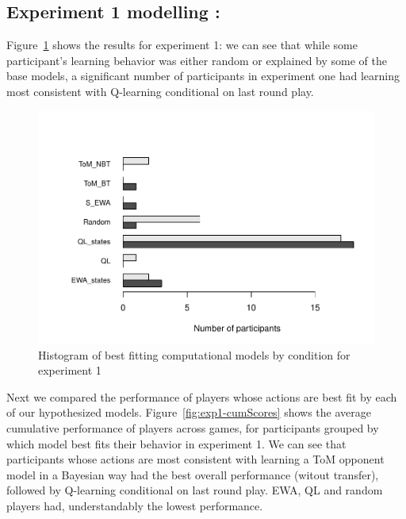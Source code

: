 \documentclass[man,floatsintext]{apa6}
\begin{document}
\hypertarget{experiment-1-modelling}{%
\subsection{Experiment 1 modelling :}\label{experiment-1-modelling}}

Figure~\ref{fig:exp1-comp-models} shows the results for experiment 1: we can see that while some participant's learning behavior was either random or explained by some of the base models, a significant number of participants in experiment one had learning most consistent with Q-learning conditional on last round play.

\begin{figure}

{\centering \includegraphics{draft_report_v1_files/figure-latex/exp1-comp-models-1} 

}

\caption{Histogram of best fitting computational models by condition for experiment 1}\label{fig:exp1-comp-models}
\end{figure}

Next we compared the performance of players whose actions are best fit by each of our hypothesized models. Figure~\ref{fig:exp1-cumScores} shows the average cumulative performance of players across games, for participants grouped by which model best fits their behavior in experiment 1. We can see that participants whose actions are most consistent with learning a ToM opponent model in a Bayesian way had the best overall performance (witout transfer), followed by Q-learning conditional on last round play. EWA, QL and random players had, understandably the lowest performance.
\end{document}
